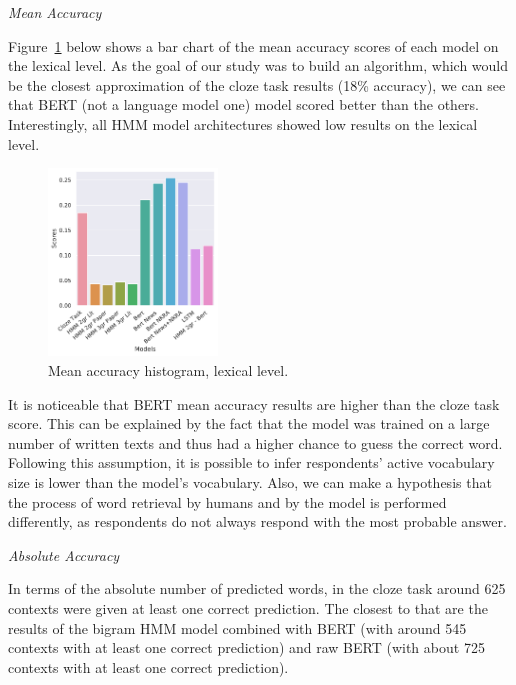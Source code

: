 \documentclass[a4paper]{article}
\newcommand{\head}[1]{\vspace{0.5em}\emph{#1}\vspace{0.25em}}
\begin{document}
\head{Mean Accuracy}

Figure~\ref{fig:mean-accuracy-hist-lex} below shows a bar chart of the mean accuracy scores of each model on
the lexical level. As the goal of our study was to build an algorithm,
which would be the closest approximation of the cloze task results
(18\% accuracy), we can see that BERT (not a language model one) model
scored better than the others. Interestingly, all HMM model
architectures showed low results on the lexical level.

\begin{figure}
\caption{Mean accuracy histogram, lexical level.}
\label{fig:mean-accuracy-hist-lex}
\centering
\includegraphics[width=0.4\textwidth]{figures/pdf/mean-accuracy-hist-lex.pdf}
\end{figure}

It is noticeable that BERT mean accuracy results are higher than the cloze task score. This can be explained by the fact that the model was trained on a large number of written texts and thus had a higher chance to guess the correct word. Following this assumption, it is possible to infer respondents' active vocabulary size is lower than the model's vocabulary. Also, we can make a hypothesis that the process of word retrieval by humans and by the model is performed differently, as respondents do not always respond with the most probable answer.

\head{Absolute Accuracy}

In terms of the absolute number of predicted words, in the cloze task around 625 contexts were given at least one correct prediction. The closest to that are the results of the bigram HMM model combined with BERT (with around 545 contexts with at least one correct prediction) and raw BERT (with about 725 contexts with at least one correct prediction).
\end{document}
